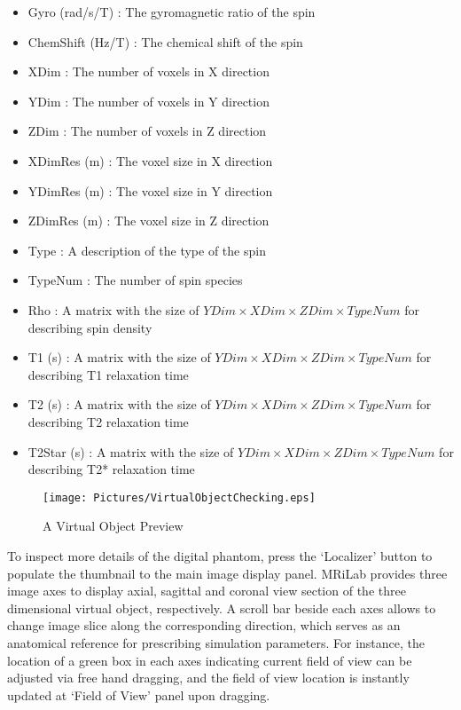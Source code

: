 \documentclass{book}%
\begin{document}
\begin{itemize}
	\item Gyro (rad/s/T) : The gyromagnetic ratio of the spin
	\item ChemShift (Hz/T) : The chemical shift of the spin
	\item XDim : The number of voxels in X direction
	\item YDim : The number of voxels in Y direction
	\item ZDim : The number of voxels in Z direction
	\item XDimRes (m) : The voxel size in X direction
	\item YDimRes (m) : The voxel size in Y direction
	\item ZDimRes (m) : The voxel size in Z direction
	\item Type : A description of the type of the spin
	\item TypeNum : The number of spin species
	\item Rho : A matrix with the size of $ YDim \times XDim \times ZDim \times TypeNum $ for describing spin density
	\item T1 (s) : A matrix with the size of $ YDim \times XDim \times ZDim \times TypeNum $ for describing T1 relaxation time
	\item T2 (s) : A matrix with the size of $ YDim \times XDim \times ZDim \times TypeNum $ for describing T2 relaxation time
	\item T2Star (s) : A matrix with the size of $ YDim \times XDim \times ZDim \times TypeNum $ for describing T2* relaxation time
\end{itemize}

\begin{figure}[htbp]
	\centering
		\texttt{[image: Pictures/VirtualObjectChecking.eps]}
	\caption{A Virtual Object Preview}
	\label{fig:VirtualObjectChecking}
\end{figure}

To inspect more details of the digital phantom, press the `Localizer' button to populate the thumbnail to the main image display panel. MRiLab provides three image axes to display axial, sagittal and coronal view section of the three dimensional virtual object, respectively. A scroll bar beside each axes allows to change image slice along the corresponding direction, which serves as an anatomical reference for prescribing simulation parameters. For instance, the location of a green box in each axes indicating current field of view can be adjusted via free hand dragging, and the field of view location is instantly updated at `Field of View' panel upon dragging.
\end{document}
